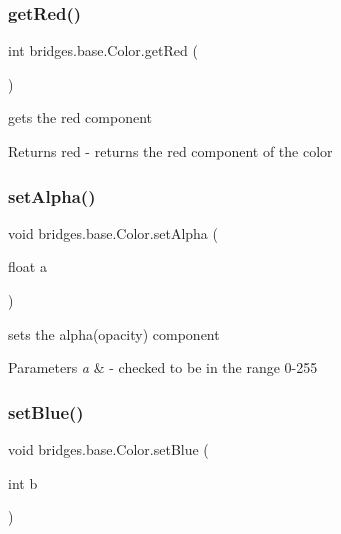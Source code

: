 \subsubsection{\texorpdfstring{get\+Red()}{getRed()}}
{\footnotesize\ttfamily int bridges.\+base.\+Color.\+get\+Red (\begin{DoxyParamCaption}{ }\end{DoxyParamCaption})}

gets the red component

\begin{DoxyReturn}{Returns}
red -\/ returns the red component of the color 
\end{DoxyReturn}
\hypertarget{classbridges_1_1base_1_1_color_afab07ce64efa1fa5797795670b0effb6}{}\label{classbridges_1_1base_1_1_color_afab07ce64efa1fa5797795670b0effb6} 
\subsubsection{\texorpdfstring{set\+Alpha()}{setAlpha()}}
{\footnotesize\ttfamily void bridges.\+base.\+Color.\+set\+Alpha (\begin{DoxyParamCaption}\item[{float}]{a }\end{DoxyParamCaption})}

sets the alpha(opacity) component


\begin{DoxyParams}{Parameters}
{\em a} & -\/ checked to be in the range 0-\/255 \\
\hline
\end{DoxyParams}
\hypertarget{classbridges_1_1base_1_1_color_a0e04156b1573cf8002c4d9cb69825657}{}\label{classbridges_1_1base_1_1_color_a0e04156b1573cf8002c4d9cb69825657} 
\subsubsection{\texorpdfstring{set\+Blue()}{setBlue()}}
{\footnotesize\ttfamily void bridges.\+base.\+Color.\+set\+Blue (\begin{DoxyParamCaption}\item[{int}]{b }\end{DoxyParamCaption})}


